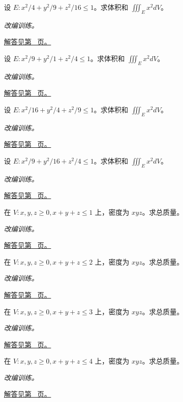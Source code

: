 \documentclass[12pt,fontset=fandol]{ctexart}
\begin{document}
\begin{example}[椭球体积与二次矩]\label{ex:c39q15}
设 $E:x^2/4+y^2/9+z^2/16\le1$。求体积和 $\iiint_Ex^2dV$。
\par\textit{改编训练。}\par\hyperref[ans:c39q15]{解答见第~\pageref{ans:c39q15} 页。}
\end{example}
\begin{example}[椭球体积与二次矩]\label{ex:c39q16}
设 $E:x^2/9+y^2/1+z^2/4\le1$。求体积和 $\iiint_Ex^2dV$。
\par\textit{改编训练。}\par\hyperref[ans:c39q16]{解答见第~\pageref{ans:c39q16} 页。}
\end{example}
\begin{example}[椭球体积与二次矩]\label{ex:c39q17}
设 $E:x^2/16+y^2/4+z^2/9\le1$。求体积和 $\iiint_Ex^2dV$。
\par\textit{改编训练。}\par\hyperref[ans:c39q17]{解答见第~\pageref{ans:c39q17} 页。}
\end{example}
\begin{example}[椭球体积与二次矩]\label{ex:c39q18}
设 $E:x^2/9+y^2/16+z^2/4\le1$。求体积和 $\iiint_Ex^2dV$。
\par\textit{改编训练。}\par\hyperref[ans:c39q18]{解答见第~\pageref{ans:c39q18} 页。}
\end{example}
\begin{example}[单纯形上的乘积密度]\label{ex:c39q19}
在 $V:x,y,z\ge0, x+y+z\le 1$ 上，密度为 $xyz$。求总质量。
\par\textit{改编训练。}\par\hyperref[ans:c39q19]{解答见第~\pageref{ans:c39q19} 页。}
\end{example}
\begin{example}[单纯形上的乘积密度]\label{ex:c39q20}
在 $V:x,y,z\ge0, x+y+z\le 2$ 上，密度为 $xyz$。求总质量。
\par\textit{改编训练。}\par\hyperref[ans:c39q20]{解答见第~\pageref{ans:c39q20} 页。}
\end{example}
\begin{example}[单纯形上的乘积密度]\label{ex:c39q21}
在 $V:x,y,z\ge0, x+y+z\le 3$ 上，密度为 $xyz$。求总质量。
\par\textit{改编训练。}\par\hyperref[ans:c39q21]{解答见第~\pageref{ans:c39q21} 页。}
\end{example}
\begin{example}[单纯形上的乘积密度]\label{ex:c39q22}
在 $V:x,y,z\ge0, x+y+z\le 4$ 上，密度为 $xyz$。求总质量。
\par\textit{改编训练。}\par\hyperref[ans:c39q22]{解答见第~\pageref{ans:c39q22} 页。}
\end{example}
\end{document}
